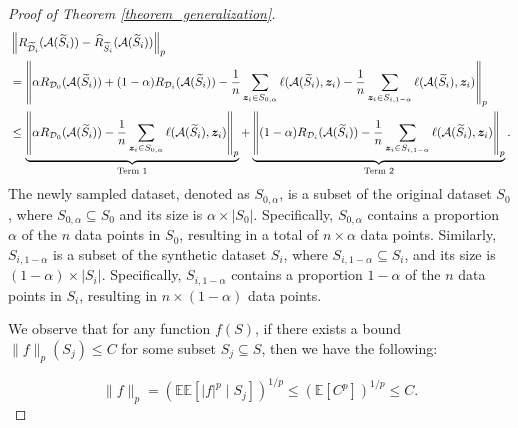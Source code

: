 \begin{proof}[Proof of Theorem \ref{theorem_generalization}]
\begin{align}
&\left\|R_{\widetilde{\mathcal{D}}_i}(\mathcal{A}(\widetilde{S}_i))-\widehat{R}_{\widetilde{S}_i}(\mathcal{A}(\widetilde{S}_i))\right\|_{p} \notag \\
&=\left\|\alpha R_{\mathcal{D}_0}(\mathcal{A}(\widetilde{S}_i))+(1-\alpha)R_{\mathcal{D}_i}(\mathcal{A}(\widetilde{S}_i))-\frac{1}{n}\sum_{\boldsymbol{z}_{i}\in S_{0,\alpha}}\ell(\mathcal{A}(\widetilde{S}_i),\boldsymbol{z}_{i})-\frac{1}{n}\sum_{\boldsymbol{z}_{i}\in S_{i,1-\alpha}}\ell(\mathcal{A}(\widetilde{S}_i),\boldsymbol{z}_{i})\right\|_{p} \notag\\
&\leq \underbrace{\left\|\alpha R_{\mathcal{D}_0}(\mathcal{A}(\widetilde{S}_i))-\frac{1}{n}\sum_{\boldsymbol{z}_{i}\in S_{0,\alpha}}\ell(\mathcal{A}(\widetilde{S}_i),\boldsymbol{z}_{i})\right\|_{p}}_{\text{Term 1}}+\underbrace{\left\|(1-\alpha)R_{\mathcal{D}_i}(\mathcal{A}(\widetilde{S}_i))-\frac{1}{n}\sum_{\boldsymbol{z}_{i}\in S_{i,1-\alpha}}\ell(\mathcal{A}(\widetilde{S}_i),\boldsymbol{z}_{i})\right\|_{p}}_{\text{Term 2}}. \label{proof-generalizati-decomp}
\end{align}
The newly sampled dataset, denoted as $S_{0, \alpha}$, is a subset of the original dataset $S_0$, where $S_{0, \alpha} \subseteq S_0$ and its size is $\alpha \times\left|S_0\right|$. Specifically, $S_{0, \alpha}$ contains a proportion $\alpha$ of the $n$ data points in $S_0$, resulting in a total of $n \times \alpha$ data points. Similarly, $S_{i, 1-\alpha}$ is a subset of the synthetic dataset $S_i$, where $S_{i, 1-\alpha} \subseteq S_i$, and its size is $(1-\alpha) \times\left|S_i\right|$. Specifically, $S_{i, 1-\alpha}$ contains a proportion $1-\alpha$ of the $n$ data points in $S_i$, resulting in $n \times(1-\alpha)$ data points.

We observe that for any function $f(S)$, if there exists a bound $\|f\|_p\left(S_j\right) \leq C$ for some subset $S_j \subseteq S$, then we have the following:

$$
\|f\|_p=\left(\mathbb{E} \mathbb{E}\left[|f|^p \mid S_j\right]\right)^{1 / p} \leq\left(\mathbb{E}\left[C^p\right]\right)^{1 / p} \leq C.
$$




\end{proof}
